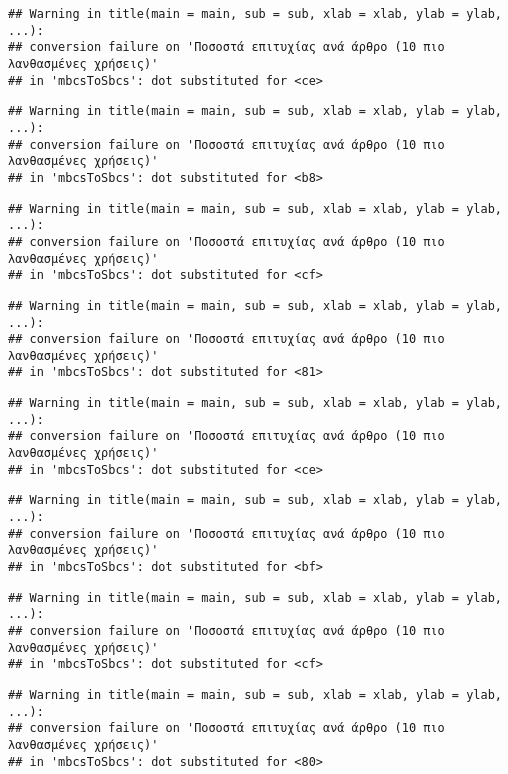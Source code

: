 \documentclass[
]{article}
\begin{document}
\begin{verbatim}
## Warning in title(main = main, sub = sub, xlab = xlab, ylab = ylab, ...):
## conversion failure on 'Ποσοστά επιτυχίας ανά άρθρο (10 πιο λανθασμένες χρήσεις)'
## in 'mbcsToSbcs': dot substituted for <ce>
\end{verbatim}

\begin{verbatim}
## Warning in title(main = main, sub = sub, xlab = xlab, ylab = ylab, ...):
## conversion failure on 'Ποσοστά επιτυχίας ανά άρθρο (10 πιο λανθασμένες χρήσεις)'
## in 'mbcsToSbcs': dot substituted for <b8>
\end{verbatim}

\begin{verbatim}
## Warning in title(main = main, sub = sub, xlab = xlab, ylab = ylab, ...):
## conversion failure on 'Ποσοστά επιτυχίας ανά άρθρο (10 πιο λανθασμένες χρήσεις)'
## in 'mbcsToSbcs': dot substituted for <cf>
\end{verbatim}

\begin{verbatim}
## Warning in title(main = main, sub = sub, xlab = xlab, ylab = ylab, ...):
## conversion failure on 'Ποσοστά επιτυχίας ανά άρθρο (10 πιο λανθασμένες χρήσεις)'
## in 'mbcsToSbcs': dot substituted for <81>
\end{verbatim}

\begin{verbatim}
## Warning in title(main = main, sub = sub, xlab = xlab, ylab = ylab, ...):
## conversion failure on 'Ποσοστά επιτυχίας ανά άρθρο (10 πιο λανθασμένες χρήσεις)'
## in 'mbcsToSbcs': dot substituted for <ce>
\end{verbatim}

\begin{verbatim}
## Warning in title(main = main, sub = sub, xlab = xlab, ylab = ylab, ...):
## conversion failure on 'Ποσοστά επιτυχίας ανά άρθρο (10 πιο λανθασμένες χρήσεις)'
## in 'mbcsToSbcs': dot substituted for <bf>
\end{verbatim}

\begin{verbatim}
## Warning in title(main = main, sub = sub, xlab = xlab, ylab = ylab, ...):
## conversion failure on 'Ποσοστά επιτυχίας ανά άρθρο (10 πιο λανθασμένες χρήσεις)'
## in 'mbcsToSbcs': dot substituted for <cf>
\end{verbatim}

\begin{verbatim}
## Warning in title(main = main, sub = sub, xlab = xlab, ylab = ylab, ...):
## conversion failure on 'Ποσοστά επιτυχίας ανά άρθρο (10 πιο λανθασμένες χρήσεις)'
## in 'mbcsToSbcs': dot substituted for <80>
\end{verbatim}
\end{document}
